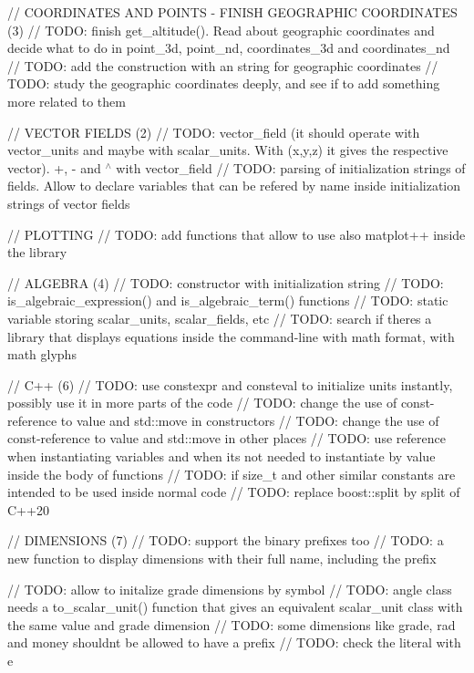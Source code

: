 // COORDINATES AND POINTS -\/ FINISH GEOGRAPHIC COORDINATES (3) // TODO\+: finish get\+\_\+altitude(). Read about geographic coordinates and decide what to do in point\+\_\+3d, point\+\_\+nd, coordinates\+\_\+3d and coordinates\+\_\+nd // TODO\+: add the construction with an string for geographic coordinates // TODO\+: study the geographic coordinates deeply, and see if to add something more related to them

// VECTOR FIELDS (2) // TODO\+: vector\+\_\+field (it should operate with vector\+\_\+units and maybe with scalar\+\_\+units. With (x,y,z) it gives the respective vector). +, -\/ and \texorpdfstring{$^\wedge$}{\string^} with vector\+\_\+field // TODO\+: parsing of initialization strings of fields. Allow to declare variables that can be refered by name inside initialization strings of vector fields

// PLOTTING // TODO\+: add functions that allow to use also matplot++ inside the library

// ALGEBRA (4) // TODO\+: constructor with initialization string // TODO\+: is\+\_\+algebraic\+\_\+expression() and is\+\_\+algebraic\+\_\+term() functions // TODO\+: static variable storing scalar\+\_\+units, scalar\+\_\+fields, etc // TODO\+: search if there\textquotesingle{}s a library that displays equations inside the command-\/line with math format, with math glyphs

// C++ (6) // TODO\+: use constexpr and consteval to initialize units instantly, possibly use it in more parts of the code // TODO\+: change the use of const-\/reference to value and std\+::move in constructors // TODO\+: change the use of const-\/reference to value and std\+::move in other places // TODO\+: use reference when instantiating variables and when it\textquotesingle{}s not needed to instantiate by value inside the body of functions // TODO\+: if size\+\_\+t and other similar constants are intended to be used inside normal code // TODO\+: replace boost\+::split by split of C++20

// DIMENSIONS (7) // TODO\+: support the binary prefixes too // TODO\+: a new function to display dimensions with their full name, including the prefix

// TODO\+: allow to initalize grade dimensions by symbol // TODO\+: angle class needs a to\+\_\+scalar\+\_\+unit() function that gives an equivalent scalar\+\_\+unit class with the same value and grade dimension // TODO\+: some dimensions like grade, rad and money shouldn\textquotesingle{}t be allowed to have a prefix // TODO\+: check the literal with e

